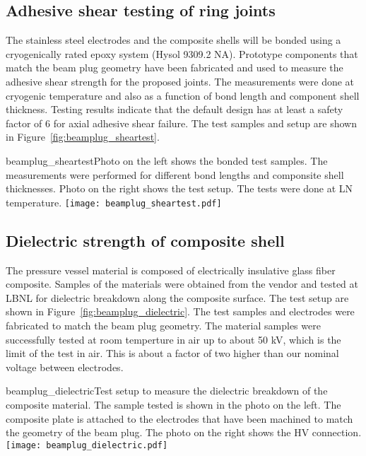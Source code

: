\subsection{Adhesive shear testing of ring joints}
The stainless steel electrodes and the composite shells will be bonded using a cryogenically rated epoxy system (Hysol 9309.2 NA). Prototype components that match the beam plug geometry have been fabricated and used to measure the adhesive shear strength for the proposed joints. The measurements were done at cryogenic temperature and also as a function of bond length and component shell thickness. Testing results indicate that the default design has at least a safety factor of 6 for axial adhesive shear failure. The test samples and setup are shown in Figure~\ref{fig:beamplug_sheartest}.

\begin{cdrfigure}{beamplug_sheartest}{Photo on the left shows the bonded test samples. The measurements were performed for different bond lengths and componsite shell thicknesses. Photo on the right shows the test setup. The tests were done at LN temperature.}
  \texttt{[image: beamplug\_sheartest.pdf]}
\end{cdrfigure}

\subsection{Dielectric strength of composite shell}
The pressure vessel material is composed of electrically insulative glass fiber composite. Samples of the materials were obtained from the vendor and tested at LBNL for dielectric breakdown along the composite surface. The test setup are shown in Figure~\ref{fig:beamplug_dielectric}. The test samples and electrodes were fabricated to match the beam plug geometry. The material samples were successfully tested at room temperture in air up to about 50 kV, which is the limit of the test in air. This is about a factor of two higher than our nominal voltage between electrodes.

\begin{cdrfigure}{beamplug_dielectric}{Test setup to measure the dielectric breakdown of the composite material. The sample tested is shown in the photo on the left. The composite plate is attached to the electrodes that have been machined to match the geometry of the beam plug. The photo on the right shows the HV connection.}
  \texttt{[image: beamplug\_dielectric.pdf]}
\end{cdrfigure}

